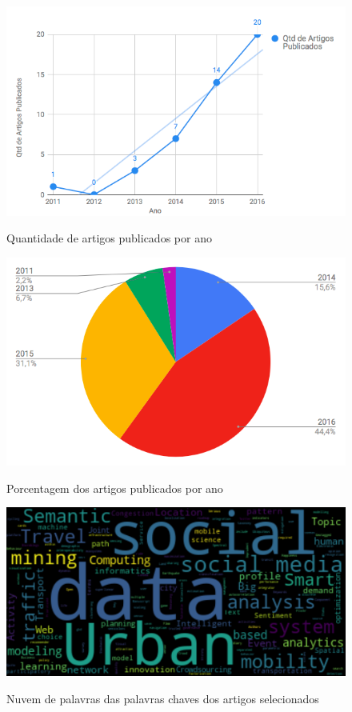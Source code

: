 \documentclass[
	12pt,				%
	oneside,			%
	a4paper,			%
	english,			%
	brazil				%
	]{abntex2ppgsi}
\begin{document}
{{\begin{figure}[H]%
	\centering
 	  \caption{Quantidade de artigos publicados por ano}
		\includegraphics[width=0.8\linewidth]{images/g1.png}
	\label{fig:qtd}
\end{figure}

\begin{figure}[H]%
	\centering
 	  \caption{Porcentagem dos artigos publicados por ano}
		\includegraphics[width=0.8\linewidth]{images/g2.png}
	\label{fig:porcentagem}
\end{figure}

\begin{figure}[H]%
	\centering
 	  \caption{Nuvem de palavras das palavras chaves dos artigos selecionados}
		\includegraphics[width=0.8\linewidth]{images/world_cloud_metodologia.png}
	\label{fig:w_cloud}
\end{figure}

}}
\end{document}
